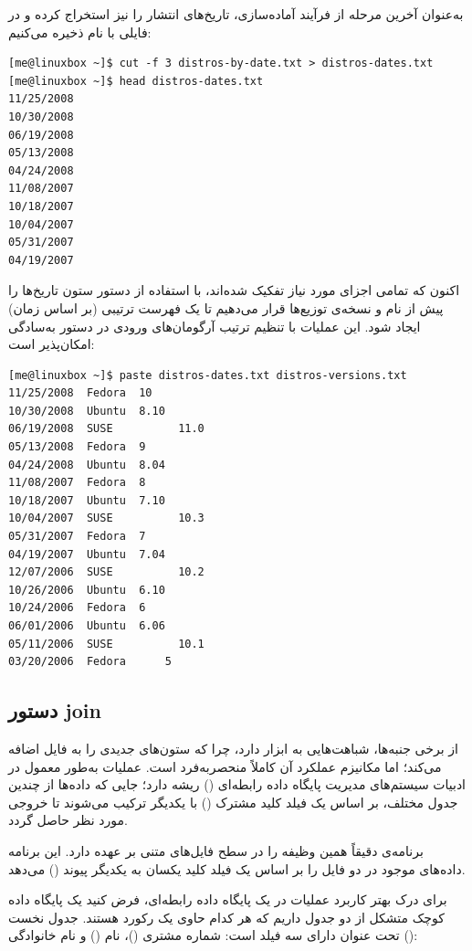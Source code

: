 به‌عنوان آخرین مرحله از فرآیند آماده‌سازی، تاریخ‌های انتشار را نیز استخراج کرده و در فایلی با نام  ذخیره می‌کنیم:

\begin{latin}
\begin{lstlisting}
[me@linuxbox ~]$ cut -f 3 distros-by-date.txt > distros-dates.txt
[me@linuxbox ~]$ head distros-dates.txt
11/25/2008
10/30/2008
06/19/2008
05/13/2008
04/24/2008
11/08/2007
10/18/2007
10/04/2007
05/31/2007
04/19/2007
\end{lstlisting}
\end{latin}

اکنون که تمامی اجزای مورد نیاز تفکیک شده‌اند، با استفاده از دستور  ستون تاریخ‌ها را پیش از نام و نسخه‌ی توزیع‌ها قرار می‌دهیم تا یک فهرست ترتیبی (بر اساس زمان) ایجاد شود. این عملیات با تنظیم ترتیب آرگومان‌های ورودی در دستور  به‌سادگی امکان‌پذیر است:

\begin{latin}
\begin{lstlisting}
[me@linuxbox ~]$ paste distros-dates.txt distros-versions.txt
11/25/2008	Fedora	10
10/30/2008	Ubuntu	8.10
06/19/2008	SUSE	      11.0
05/13/2008	Fedora	9
04/24/2008	Ubuntu	8.04
11/08/2007	Fedora	8
10/18/2007	Ubuntu	7.10
10/04/2007	SUSE	      10.3
05/31/2007	Fedora	7
04/19/2007	Ubuntu	7.04
12/07/2006	SUSE	      10.2
10/26/2006	Ubuntu	6.10
10/24/2006	Fedora	6
06/01/2006	Ubuntu	6.06
05/11/2006	SUSE	      10.1
03/20/2006	Fedora      5
\end{lstlisting}
\end{latin}

\subsection{دستور join}

از برخی جنبه‌ها،  شباهت‌هایی به ابزار  دارد، چرا که ستون‌های جدیدی را به فایل اضافه می‌کند؛ اما مکانیزم عملکرد آن کاملاً منحصربه‌فرد است. عملیات  به‌طور معمول در ادبیات سیستم‌های مدیریت پایگاه داده رابطه‌ای () ریشه دارد؛ جایی که داده‌ها از چندین جدول مختلف، بر اساس یک فیلد کلید مشترک () با یکدیگر ترکیب می‌شوند تا خروجی مورد نظر حاصل گردد.

برنامه‌ی  دقیقاً همین وظیفه را در سطح فایل‌های متنی بر عهده دارد. این برنامه داده‌های موجود در دو فایل را بر اساس یک فیلد کلید یکسان به یکدیگر پیوند () می‌دهد.

برای درک بهتر کاربرد عملیات  در یک پایگاه داده رابطه‌ای، فرض کنید یک پایگاه داده کوچک متشکل از دو جدول داریم که هر کدام حاوی یک رکورد هستند. جدول نخست تحت عنوان  دارای سه فیلد است: شماره مشتری ()، نام () و نام خانوادگی ():

